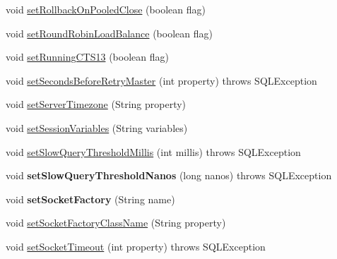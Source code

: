 \begin{DoxyCompactItemize}
\item 
void \mbox{\hyperlink{classcom_1_1mysql_1_1jdbc_1_1jdbc2_1_1optional_1_1_connection_wrapper_a9d43b30760d413e9c1278f85a7f63349}{set\+Rollback\+On\+Pooled\+Close}} (boolean flag)
\item 
void \mbox{\hyperlink{classcom_1_1mysql_1_1jdbc_1_1jdbc2_1_1optional_1_1_connection_wrapper_a443c2aa5fdc8084aa721378f69257562}{set\+Round\+Robin\+Load\+Balance}} (boolean flag)
\item 
void \mbox{\hyperlink{classcom_1_1mysql_1_1jdbc_1_1jdbc2_1_1optional_1_1_connection_wrapper_a7a84fadba26631fe6770c399ab0a5e8a}{set\+Running\+C\+T\+S13}} (boolean flag)
\item 
void \mbox{\hyperlink{classcom_1_1mysql_1_1jdbc_1_1jdbc2_1_1optional_1_1_connection_wrapper_af7f390ffe3cd2dea5f5192e52147be89}{set\+Seconds\+Before\+Retry\+Master}} (int property)  throws S\+Q\+L\+Exception 
\item 
void \mbox{\hyperlink{classcom_1_1mysql_1_1jdbc_1_1jdbc2_1_1optional_1_1_connection_wrapper_a7163560fbf41796601a4d01ef978dd09}{set\+Server\+Timezone}} (String property)
\item 
void \mbox{\hyperlink{classcom_1_1mysql_1_1jdbc_1_1jdbc2_1_1optional_1_1_connection_wrapper_a7c272bd82ff6771c2ab657ee759dfa00}{set\+Session\+Variables}} (String variables)
\item 
void \mbox{\hyperlink{classcom_1_1mysql_1_1jdbc_1_1jdbc2_1_1optional_1_1_connection_wrapper_ac0a113a1ba7f79345af3609e978a93fe}{set\+Slow\+Query\+Threshold\+Millis}} (int millis)  throws S\+Q\+L\+Exception 
\item 
\mbox{\label{classcom_1_1mysql_1_1jdbc_1_1jdbc2_1_1optional_1_1_connection_wrapper_ab0e34e9e6620eda3ca17a5fe873c54b8}} 
void {\bfseries set\+Slow\+Query\+Threshold\+Nanos} (long nanos)  throws S\+Q\+L\+Exception 
\item 
\mbox{\label{classcom_1_1mysql_1_1jdbc_1_1jdbc2_1_1optional_1_1_connection_wrapper_a92fdb822073316a2d4630cffab76360d}} 
void {\bfseries set\+Socket\+Factory} (String name)
\item 
void \mbox{\hyperlink{classcom_1_1mysql_1_1jdbc_1_1jdbc2_1_1optional_1_1_connection_wrapper_a7a51e27bd16ff0326a017cb9efe65e53}{set\+Socket\+Factory\+Class\+Name}} (String property)
\item 
void \mbox{\hyperlink{classcom_1_1mysql_1_1jdbc_1_1jdbc2_1_1optional_1_1_connection_wrapper_a9714df2e97bd14e45f7f7a93ba7f4673}{set\+Socket\+Timeout}} (int property)  throws S\+Q\+L\+Exception 

\end{DoxyCompactItemize}
